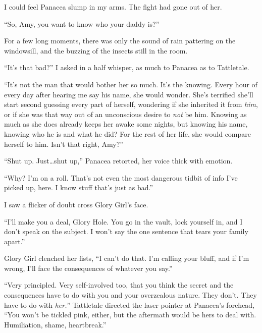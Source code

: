 I could feel Panacea slump in my arms.  The fight had gone out of her.



``So, Amy, you want to know who your daddy is?''



For a few long moments, there was only the sound of rain pattering on the windowsill, and the buzzing of the insects still in the room.



``It's that bad?'' I asked in a half whisper, as much to Panacea as to Tattletale.



``It's not the man that would bother her so much.  It's the knowing.  Every hour of every day after hearing me say his name, she would wonder.  She's terrified she'll start second guessing every part of herself, wondering if she inherited it from \emph{him}, or if she was that way out of an unconscious desire to \emph{not} be him.  Knowing as much as she does already keeps her awake some nights, but knowing his name, knowing who he is and what he did?  For the rest of her life, she would compare herself to him.  Isn't that right, Amy?''



``Shut up.  Just\ldots shut up,'' Panacea retorted, her voice thick with emotion.



``Why?  I'm on a roll.  That's not even the most dangerous tidbit of info I've picked up, here.  I know stuff that's just as bad.''



I saw a flicker of doubt cross Glory Girl's face.



``I'll make you a deal, Glory Hole.  You go in the vault, lock yourself in, and I don't speak on the subject.  I won't say the one sentence that tears your family apart.''



Glory Girl clenched her fists, ``I can't do that.  I'm calling your bluff, and if I'm wrong, I'll face the consequences of whatever you say.''



``Very principled.  Very self-involved too, that you think the secret and the consequences have to do with you and your overzealous nature.  They don't.  They have to do with \emph{her.}''  Tattletale directed the laser pointer at Panacea's forehead, ``You won't be tickled pink, either, but the aftermath would be hers to deal with.  Humiliation, shame, heartbreak.''



